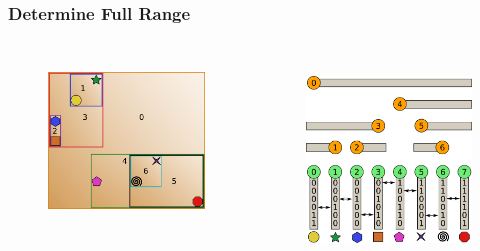 \documentclass{beamer}
\begin{document}
\begin{frame}
  \frametitle{Determine Full Range}
  
\begin{columns}[t]

\begin{figure}
\includegraphics[height=45mm]{primitive-box.png}
\end{figure}

\begin{figure}
\includegraphics[height=55mm]{algo_2.png}
\end{figure}
\end{columns}
\end{frame}
\end{document}
